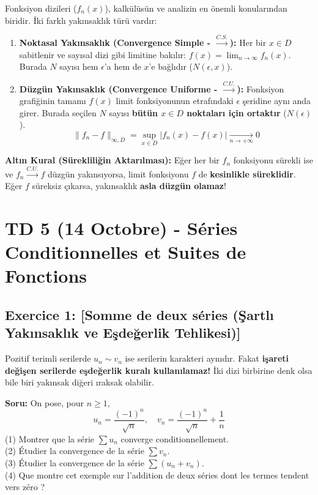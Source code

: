 \documentclass[12pt,a4paper]{report}
\begin{document}
\begin{tcolorbox}[colback=teal!5!white,colframe=teal!75!black,title=Temel Teori: Noktasal ve Düzgün Yakınsaklık (Convergence Simple vs Uniforme)]
Fonksiyon dizileri ($f_n(x)$), kalkülüsün ve analizin en önemli konularından biridir. İki farklı yakınsaklık türü vardır:
\begin{enumerate}
    \item \textbf{Noktasal Yakınsaklık (Convergence Simple - $\xrightarrow{C.S.}$):} Her bir $x \in D$ sabitlenir ve sayısal dizi gibi limitine bakılır: $f(x) = \lim_{n \to \infty} f_n(x)$. Burada $N$ sayısı hem $\epsilon$'a hem de $x$'e bağlıdır ($N(\epsilon, x)$).
    \item \textbf{Düzgün Yakınsaklık (Convergence Uniforme - $\xrightarrow{C.U.}$):} Fonksiyon grafiğinin tamamı $f(x)$ limit fonksiyonunun etrafındaki $\epsilon$ şeridine aynı anda girer. Burada seçilen $N$ sayısı \textbf{bütün $x \in D$ noktaları için ortaktır} ($N(\epsilon)$).
    \[ \|f_n - f\|_{\infty, D} = \sup_{x \in D} |f_n(x) - f(x)| \xrightarrow[n \to +\infty]{} 0 \]
\end{enumerate}
\textbf{Altın Kural (Sürekliliğin Aktarılması):} Eğer her bir $f_n$ fonksiyonu sürekli ise ve $f_n \xrightarrow{C.U.} f$ düzgün yakınsıyorsa, limit fonksiyonu $f$ de \textbf{kesinlikle süreklidir}. Eğer $f$ süreksiz çıkarsa, yakınsaklık \textbf{asla düzgün olamaz}!
\end{tcolorbox}

\section{TD 5 (14 Octobre) - Séries Conditionnelles et Suites de Fonctions}

\subsection*{Exercice 1: [Somme de deux séries (Şartlı Yakınsaklık ve Eşdeğerlik Tehlikesi)]}

\begin{tcolorbox}[colback=red!5!white,colframe=red!75!black,title=Çok Önemli Uyarı: İşareti Değişen Serilerde Eşdeğerlik Kuralı GEÇERSİZDİR!]
Pozitif terimli serilerde $u_n \sim v_n$ ise serilerin karakteri aynıdır. Fakat \textbf{işareti değişen serilerde eşdeğerlik kuralı kullanılamaz!} İki dizi birbirine denk olsa bile biri yakınsak diğeri ıraksak olabilir.
\end{tcolorbox}

\textbf{Soru:}
On pose, pour $n \ge 1$,
\[ u_n = \frac{(-1)^n}{\sqrt{n}}, \quad v_n = \frac{(-1)^n}{\sqrt{n}} + \frac{1}{n} \]
(1) Montrer que la série $\sum u_n$ converge conditionnellement.\\
(2) Étudier la convergence de la série $\sum v_n$.\\
(3) Étudier la convergence de la série $\sum (u_n + v_n)$.\\
(4) Que montre cet exemple sur l'addition de deux séries dont les termes tendent vers zéro ?
\end{document}
